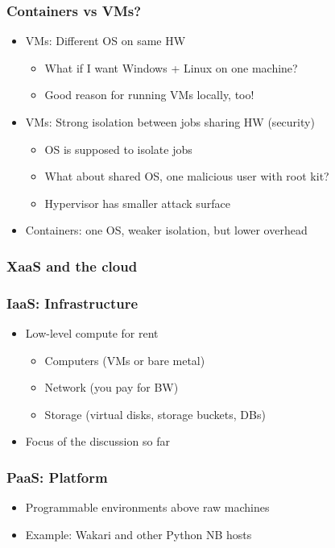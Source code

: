 \documentclass{beamer}
\begin{document}
\begin{frame}
  \frametitle{Containers vs VMs?}

  \begin{itemize}
    \item VMs: Different OS on same HW
      \begin{itemize}
      \item What if I want Windows + Linux on one machine?
      \item Good reason for running VMs locally, too!
      \end{itemize}
    \item VMs: Strong isolation between jobs sharing HW (security)
      \begin{itemize}
      \item OS is supposed to isolate jobs
      \item What about shared OS, one malicious user with root kit?
      \item Hypervisor has smaller attack surface
      \end{itemize}
    \item Containers: one OS, weaker isolation, but lower overhead
  \end{itemize}
\end{frame}


\begin{frame}
  \frametitle{XaaS and the cloud}
\end{frame}

\begin{frame}
  \frametitle{IaaS: Infrastructure}

  \begin{itemize}
  \item Low-level compute for rent
    \begin{itemize}
    \item Computers (VMs or bare metal)
    \item Network (you pay for BW)
    \item Storage (virtual disks, storage buckets, DBs)
    \end{itemize}
  \item Focus of the discussion so far
  \end{itemize}
\end{frame}

\begin{frame}
  \frametitle{PaaS: Platform}

  \begin{itemize}
  \item Programmable environments above raw machines
  \item Example: Wakari and other Python NB hosts
  \end{itemize}
\end{frame}
\end{document}
